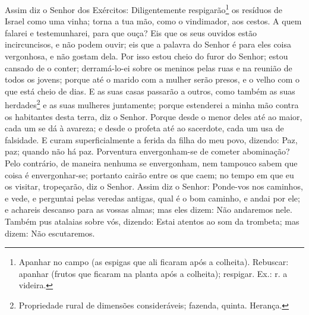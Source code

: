 Assim diz o Senhor dos Exércitos: Diligentemente
respigarão\footnote{Apanhar no campo (as espigas que ali ficaram
após a colheita). Rebuscar: apanhar (frutos que ficaram na planta
após a colheita); respigar. Ex.: r. a videira.} os resíduos de
Israel como uma vinha; torna a tua mão, como o vindimador, aos
cestos. A quem falarei e testemunharei, para que ouça? Eis
que os seus ouvidos estão incircuncisos, e não podem ouvir; eis que
a palavra do Senhor é para eles coisa vergonhosa, e não gostam dela.
Por isso estou cheio do furor do Senhor; estou cansado de o
conter; derramá-lo-ei sobre os meninos pelas ruas e na reunião de
todos os jovens; porque até o marido com a mulher serão presos, e o
velho com o que está cheio de dias. E as suas casas passarão
a outros, como também as suas herdades\footnote{Propriedade rural de
dimensões consideráveis; fazenda, quinta. Herança.} e as suas
mulheres juntamente; porque estenderei a minha mão contra os
habitantes desta terra, diz o Senhor. Porque desde o menor
deles até ao maior, cada um se dá à avareza; e desde o profeta até
ao sacerdote, cada um usa de falsidade. E curam
superficialmente a ferida da filha do meu povo, dizendo: Paz, paz;
quando não há paz. Porventura envergonham-se de cometer
abominação? Pelo contrário, de maneira nenhuma se envergonham, nem
tampouco sabem que coisa é envergonhar-se; portanto cairão entre os
que caem; no tempo em que eu os visitar, tropeçarão, diz o Senhor.
Assim diz o Senhor: Ponde-vos nos caminhos, e vede, e
perguntai pelas veredas antigas, qual é o bom caminho, e andai por
ele; e achareis descanso para as vossas almas; mas eles dizem: Não
andaremos nele. Também pus atalaias sobre vós, dizendo: Estai
atentos ao som da trombeta; mas dizem: Não escutaremos.

